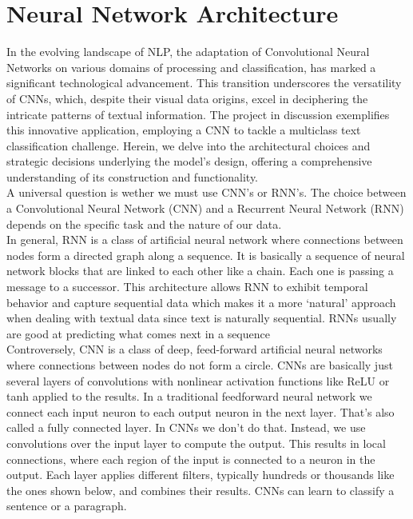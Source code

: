 \section{Neural Network Architecture}
In the evolving landscape of NLP, the adaptation of Convolutional Neural Networks on various domains of processing and classification, has marked a significant technological advancement. This transition underscores the versatility of CNNs, which, despite their visual data origins, excel in deciphering the intricate patterns of textual information. The project in discussion exemplifies this innovative application, employing a CNN to tackle a multiclass text classification challenge. Herein, we delve into the architectural choices and strategic decisions underlying the model's design, offering a comprehensive understanding of its construction and functionality. \\
A universal question is wether we must use CNN's or RNN's. The choice between a Convolutional Neural Network (CNN) and a Recurrent Neural Network (RNN) depends on the specific task and the nature of our data. \\

In general, RNN is a class of artificial neural network where connections between nodes form a directed graph along a sequence. It is basically a sequence of neural network blocks that are linked to each other like a chain. Each one is passing a message to a successor. This architecture allows RNN to exhibit temporal behavior and capture sequential data which makes it a more ‘natural’ approach when dealing with textual data since text is naturally sequential. RNNs usually are good at predicting what comes next in a sequence\\

Controversely, CNN is a class of deep, feed-forward artificial neural networks where connections between nodes do not form a circle. CNNs are basically just several layers of convolutions with nonlinear activation functions like ReLU or tanh applied to the results. In a traditional feedforward neural network we connect each input neuron to each output neuron in the next layer. That’s also called a fully connected layer. In CNNs we don’t do that. Instead, we use convolutions over the input layer to compute the output. This results in local connections, where each region of the input is connected to a neuron in the output. Each layer applies different filters, typically hundreds or thousands like the ones shown below, and combines their results. CNNs can learn to classify a sentence or a paragraph.\\

